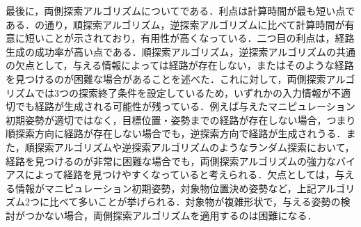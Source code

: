 \documentclass[a4paper,twoside,12pt,papersize, dvipdfmx]{iirthesis}
\begin{document}
{最後に，両側探索アルゴリズムについてである．利点は計算時間が最も短い点である．の通り，順探索アルゴリズム，逆探索アルゴリズムに比べて計算時間が有意に短いことが示されており，有用性が高くなっている．二つ目の利点は，経路生成の成功率が高い点である．順探索アルゴリズム，逆探索アルゴリズムの共通の欠点として，与える情報によっては経路が存在しない，またはそのような経路を見つけるのが困難な場合があることを述べた．これに対して，両側探索アルゴリズムでは3つの探索終了条件を設定しているため，いずれかの入力情報が不適切でも経路が生成される可能性が残っている．例えば与えたマニピュレーション初期姿勢が適切ではなく，目標位置・姿勢までの経路が存在しない場合，つまり順探索方向に経路が存在しない場合でも，逆探索方向で経路が生成されうる．また，順探索アルゴリズムや逆探索アルゴリズムのようなランダム探索において，経路を見つけるのが非常に困難な場合でも，両側探索アルゴリズムの強力なバイアスによって経路を見つけやすくなっていると考えられる．欠点としては，与える情報がマニピュレーション初期姿勢，対象物位置決め姿勢など，上記アルゴリズム2つに比べて多いことが挙げられる．対象物が複雑形状で，与える姿勢の検討がつかない場合，両側探索アルゴリズムを適用するのは困難になる．\par

}
\end{document}
